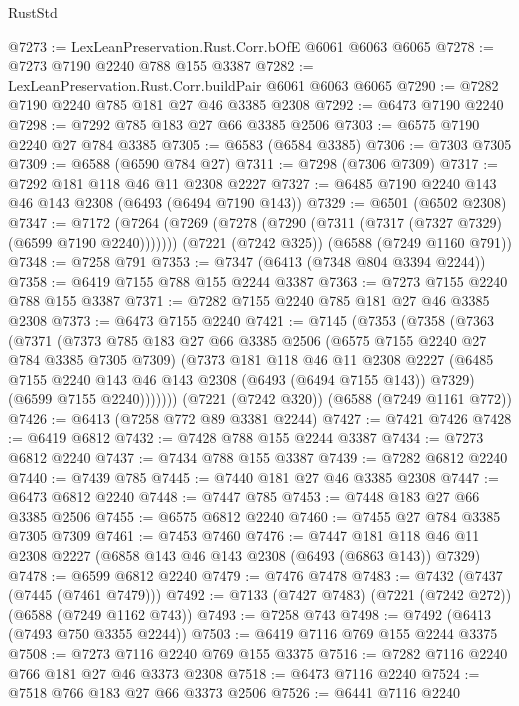\begin{lexlean}{RustStd}
\begin{coremodule}
@7273 := LexLeanPreservation.Rust.Corr.bOfE @6061 @6063 @6065
@7278 := @7273 @7190 @2240 @788 @155 @3387
@7282 := LexLeanPreservation.Rust.Corr.buildPair @6061 @6063 @6065
@7290 := @7282 @7190 @2240 @785 @181 @27 @46 @3385 @2308
@7292 := @6473 @7190 @2240
@7298 := @7292 @785 @183 @27 @66 @3385 @2506
@7303 := @6575 @7190 @2240 @27 @784 @3385
@7305 := @6583 (@6584 @3385)
@7306 := @7303 @7305
@7309 := @6588 (@6590 @784 @27)
@7311 := @7298 (@7306 @7309)
@7317 := @7292 @181 @118 @46 @11 @2308 @2227
@7327 := @6485 @7190 @2240 @143 @46 @143 @2308 (@6493 (@6494 @7190 @143))
@7329 := @6501 (@6502 @2308)
@7347 := @7172
    (@7264 (@7269 (@7278 (@7290 (@7311 (@7317 (@7327 @7329) (@6599 @7190 @2240)))))))
    (@7221 (@7242 @325))
    (@6588 (@7249 @1160 @791))
@7348 := @7258 @791
@7353 := @7347 (@6413 (@7348 @804 @3394 @2244))
@7358 := @6419 @7155 @788 @155 @2244 @3387
@7363 := @7273 @7155 @2240 @788 @155 @3387
@7371 := @7282 @7155 @2240 @785 @181 @27 @46 @3385 @2308
@7373 := @6473 @7155 @2240
@7421 := @7145
    (@7353
      (@7358
        (@7363
          (@7371
            (@7373
              @785
              @183
              @27
              @66
              @3385
              @2506
              (@6575 @7155 @2240 @27 @784 @3385 @7305 @7309)
              (@7373
                @181
                @118
                @46
                @11
                @2308
                @2227
                (@6485 @7155 @2240 @143 @46 @143 @2308 (@6493 (@6494 @7155 @143)) @7329)
                (@6599 @7155 @2240)))))))
    (@7221 (@7242 @320))
    (@6588 (@7249 @1161 @772))
@7426 := @6413 (@7258 @772 @89 @3381 @2244)
@7427 := @7421 @7426
@7428 := @6419 @6812
@7432 := @7428 @788 @155 @2244 @3387
@7434 := @7273 @6812 @2240
@7437 := @7434 @788 @155 @3387
@7439 := @7282 @6812 @2240
@7440 := @7439 @785
@7445 := @7440 @181 @27 @46 @3385 @2308
@7447 := @6473 @6812 @2240
@7448 := @7447 @785
@7453 := @7448 @183 @27 @66 @3385 @2506
@7455 := @6575 @6812 @2240
@7460 := @7455 @27 @784 @3385 @7305 @7309
@7461 := @7453 @7460
@7476 := @7447 @181 @118 @46 @11 @2308 @2227 (@6858 @143 @46 @143 @2308 (@6493 (@6863 @143)) @7329)
@7478 := @6599 @6812 @2240
@7479 := @7476 @7478
@7483 := @7432 (@7437 (@7445 (@7461 @7479)))
@7492 := @7133 (@7427 @7483) (@7221 (@7242 @272)) (@6588 (@7249 @1162 @743))
@7493 := @7258 @743
@7498 := @7492 (@6413 (@7493 @750 @3355 @2244))
@7503 := @6419 @7116 @769 @155 @2244 @3375
@7508 := @7273 @7116 @2240 @769 @155 @3375
@7516 := @7282 @7116 @2240 @766 @181 @27 @46 @3373 @2308
@7518 := @6473 @7116 @2240
@7524 := @7518 @766 @183 @27 @66 @3373 @2506
@7526 := @6441 @7116 @2240

\end{coremodule}
\end{lexlean}
